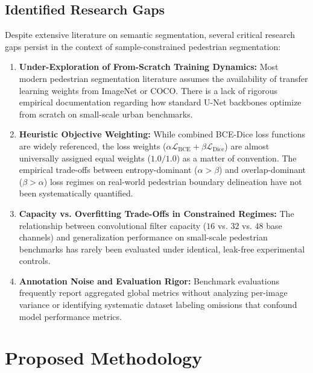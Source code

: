 \documentclass[10pt,a4paper]{report}
\begin{document}
\section{Identified Research Gaps}
Despite extensive literature on semantic segmentation, several critical research gaps persist in the context of sample-constrained pedestrian segmentation:
\begin{enumerate}
    \item \textbf{Under-Exploration of From-Scratch Training Dynamics:} Most modern pedestrian segmentation literature assumes the availability of transfer learning weights from ImageNet or COCO. There is a lack of rigorous empirical documentation regarding how standard U-Net backbones optimize from scratch on small-scale urban benchmarks.
    \item \textbf{Heuristic Objective Weighting:} While combined BCE-Dice loss functions are widely referenced, the loss weights ($\alpha \mathcal{L}_{\text{BCE}} + \beta \mathcal{L}_{\text{Dice}}$) are almost universally assigned equal weights ($1.0 / 1.0$) as a matter of convention. The empirical trade-offs between entropy-dominant ($\alpha > \beta$) and overlap-dominant ($\beta > \alpha$) loss regimes on real-world pedestrian boundary delineation have not been systematically quantified.
    \item \textbf{Capacity vs. Overfitting Trade-Offs in Constrained Regimes:} The relationship between convolutional filter capacity ($16$ vs. $32$ vs. $48$ base channels) and generalization performance on small-scale pedestrian benchmarks has rarely been evaluated under identical, leak-free experimental controls.
    \item \textbf{Annotation Noise and Evaluation Rigor:} Benchmark evaluations frequently report aggregated global metrics without analyzing per-image variance or identifying systematic dataset labeling omissions that confound model performance metrics.
\end{enumerate}

\chapter{Proposed Methodology}
\label{chap:methodology}
\end{document}
